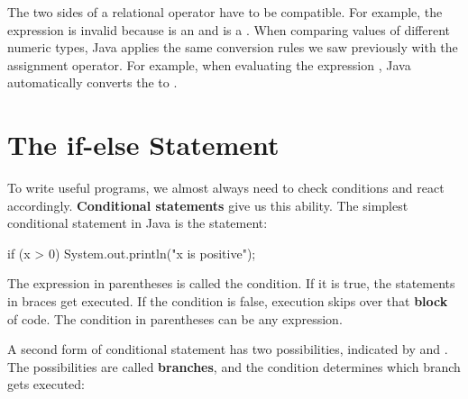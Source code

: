 The two sides of a relational operator have to be compatible.
For example, the expression  is invalid because  is an  and  is a .
When comparing values of different numeric types, Java applies the same conversion rules we saw previously with the assignment operator.
For example, when evaluating the expression , Java automatically converts the  to .

%
%


\section{The if-else Statement}


To write useful programs, we almost always need to check conditions and react accordingly.
{\bf Conditional statements} give us this ability.
The simplest conditional statement in Java is the  statement:

\begin{code}
if (x > 0) {
    System.out.println("x is positive");
}
\end{code}


The expression in parentheses is called the condition.
If it is true, the statements in braces get executed.
If the condition is false, execution skips over that {\bf block} of code.
The condition in parentheses can be any  expression.


A second form of conditional statement has two possibilities, indicated by  and .
The possibilities are called {\bf branches}, and the condition determines which branch gets executed:

